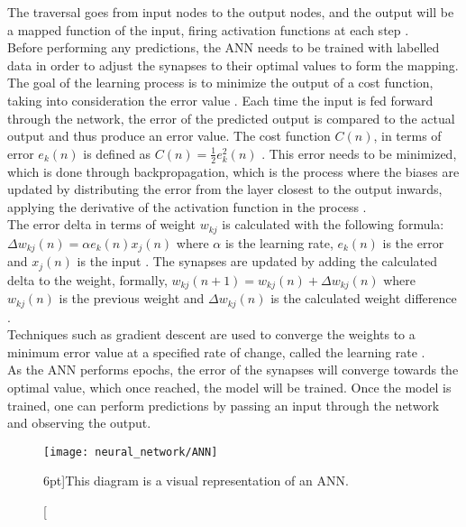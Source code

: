 The traversal goes from input nodes to the output nodes, and the output will be a mapped function of the input, firing activation functions at each step \cite{GURESEN2011426, sharmav_2017}.\\ Before performing any predictions, the ANN needs to be trained with labelled data in order to adjust the synapses to their optimal values to form the mapping. \\ The goal of the learning process is to minimize the output of a cost function, taking into consideration the error value \cite{Haykin:1994:NNC:541500}. Each time the input is fed forward through the network, the error of the predicted output is compared to the actual output and thus produce an error value. The cost function $C(n)$, in terms of error $e_k(n)$ is defined as $C(n) = \frac{1}{2}e^2_k(n)$ \cite{Haykin:1994:NNC:541500}. This error needs to be minimized, which is done through backpropagation, which is the process where the biases are updated by distributing the error from the layer closest to the output inwards, applying the derivative of the activation function in the process \cite{doi:10.1080/02626669809492102}.\\ The error delta in terms of weight $w_{kj}$ is calculated with the following formula: $\Delta w_{kj}(n) = \alpha e_k(n)x_j(n)$ where $\alpha$ is the learning rate, $e_k(n)$ is the error and $x_j(n)$ is the input \cite{Haykin:1994:NNC:541500}. The synapses are updated by adding the calculated delta to the weight, formally, $w_{kj}(n+1) = w_{kj}(n) + \Delta w_{kj}(n)$ where $w_{kj}(n)$ is the previous weight and $\Delta w_{kj}(n)$ is the calculated weight difference \cite{Haykin:1994:NNC:541500}.\\ Techniques such as gradient descent are used to converge the weights to a minimum error value at a specified rate of change, called the learning rate \cite{doi:10.1080/02626669809492102}.\\ As the ANN performs epochs, the error of the synapses will converge towards the optimal value, which once reached, the model will be trained. Once the model is trained, one can perform predictions by passing an input through the network and observing the output.
\begin{figure}
	\texttt{[image: neural\_network/ANN]}
	\caption[ANN][6pt]{This diagram is a visual representation of an ANN.}
	\label{fig:annfig}
\end{figure}

